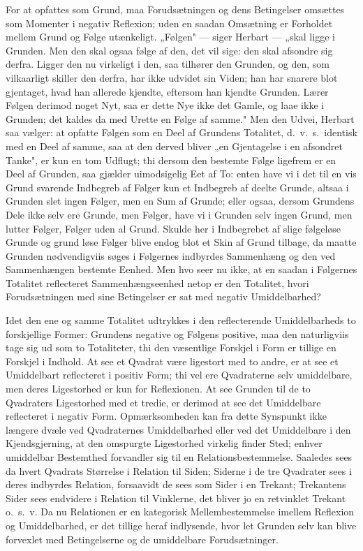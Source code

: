 \documentclass[12pt]{book}
\newcommand{\opage}[1]{\marginnote{\footnotesize\textit{[#1]}}}
\begin{document}
\opage{88} For at opfattes som Grund, maa Forudsætningen og dens Betingelser omsættes som
Momenter i negativ Reflexion; uden en saadan Omsætning er Forholdet mellem Grund og
Følge utænkeligt. „Følgen" --- siger Herbart --- „skal ligge i Grunden. Men den skal
ogsaa følge af den, det vil sige: den skal afsondre sig derfra. Ligger den nu
virkeligt i den, saa tilhører den Grunden, og den, som vilkaarligt skiller den
derfra, har ikke udvidet sin Viden; han har snarere blot gjentaget, hvad han allerede
kjendte, eftersom han kjendte Grunden. Lærer Følgen derimod noget Nyt, saa er dette
Nye ikke det Gamle, og laae ikke i Grunden; det kaldes da med Urette en Følge af
samme." Men den Udvei, Herbart saa vælger: at opfatte Følgen som en Deel af Grundens
Totalitet, d.\ v.\ s.\ identisk med en Deel af samme, saa at den derved bliver „en
Gjentagelse i en afsondret Tanke", er kun en tom Udflugt; thi dersom den bestemte
Følge ligefrem er en Deel af Grunden, saa gjælder uimodsigelig Eet af To: enten have
vi i det til en vis Grund svarende Indbegreb af Følger kun et Indbegreb af deelte
Grunde, altsaa i Grunden slet ingen Følger, men en Sum af Grunde; eller ogsaa, dersom
Grundens Dele ikke selv ere Grunde, men Følger, have vi i Grunden selv ingen Grund,
men lutter Følger, Følger uden al Grund. Skulde her i Indbegrebet af slige følgeløse
Grunde og grund%
\opage{89} løse Følger blive endog blot et Skin af Grund tilbage, da maatte Grunden
nødvendigviis søges i Følgernes indbyrdes Sammenhæng og den ved Sammenhængen bestemte
Eenhed. Men hvo seer nu ikke, at en saadan i Følgernes Totalitet reflecteret
Sammenhængseenhed netop er den Totalitet, hvori Forudsætningen med sine Betingelser
er sat med negativ Umiddelbarhed?

Idet den ene og samme Totalitet udtrykkes i den reflecterende Umiddelbarheds to
forskjellige Former: Grundens negative og Følgens positive, maa den naturligviis tage
sig ud som to Totaliteter, thi den væsentlige Forskjel i Form er tillige en Forskjel
i Indhold. At see et Qvadrat være ligestort med to andre, er at see et Umiddelbart
reflecteret i positiv Form; thi vel ere Qvadraterne selv umiddelbare, men deres
Ligestorhed er kun for Reflexionen. At see Grunden til de to Qvadraters Ligestorhed
med et tredie, er derimod at see det Umiddelbare reflecteret i negativ Form.
Opmærksomheden kan fra dette Synspunkt ikke længere dvæle ved Qvadraternes
Umiddelbarhed eller ved det Umiddelbare i den Kjendsgjerning, at den omspurgte
Ligestorhed virkelig finder Sted; enhver umiddelbar Bestemthed forvandler sig til en
Relationsbestemmelse. Saaledes sees da hvert Qvadrats Størrelse i Relation til Siden;
Siderne i de tre Qvadrater sees i deres indbyrdes Relation, forsaavidt de sees som
Sider i en Trekant; Trekantens Sider sees endvidere i Relation til Vinklerne, det
bliver jo en retvinklet Trekant o.\ s.\ v. Da nu Relationen er en kategorisk
Mellembestemmelse imellem Reflexion og Umiddelbarhed, er det tillige heraf
indlysende, hvor let Grunden selv kan blive forvexlet med Betingelserne og de
umiddelbare Forudsætninger.
\end{document}

